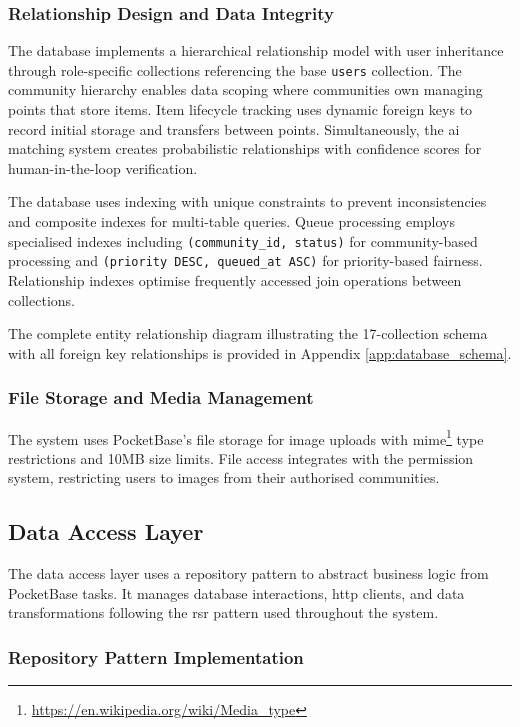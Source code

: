 \subsubsection{Relationship Design and Data Integrity}

The database implements a hierarchical relationship model with user inheritance through role-specific collections referencing the base \texttt{users} collection. The community hierarchy enables data scoping where communities own managing points that store items. Item lifecycle tracking uses dynamic foreign keys to record initial storage and transfers between points. Simultaneously, the \ac{ai} matching system creates probabilistic relationships with confidence scores for human-in-the-loop verification.

The database uses indexing with unique constraints to prevent inconsistencies and composite indexes for multi-table queries. Queue processing employs specialised indexes including \texttt{(community\_id, status)} for community-based processing and \texttt{(priority DESC, queued\_at ASC)} for priority-based fairness. Relationship indexes optimise frequently accessed join operations between collections.

The complete entity relationship diagram illustrating the 17-collection schema with all foreign key relationships is provided in Appendix \ref{app:database_schema}.

\subsubsection{File Storage and Media Management}

The system uses PocketBase's file storage for image uploads with \ac{mime}\footnote{\url{https://en.wikipedia.org/wiki/Media_type}} type restrictions and 10MB size limits. File access integrates with the permission system, restricting users to images from their authorised communities.

\subsection{Data Access Layer} \label{subsection:data_access_layer}

The data access layer uses a repository pattern to abstract business logic from PocketBase tasks. It manages database interactions, \ac{http} clients, and data transformations following the \ac{rsr} pattern used throughout the system.

\subsubsection{Repository Pattern Implementation}


